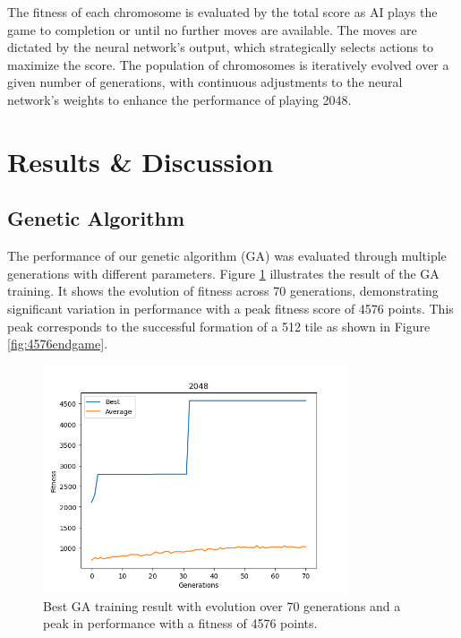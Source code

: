 \documentclass[11pt]{article}
\begin{document}
The fitness of each chromosome is evaluated by the total score as AI plays the game to completion or until no further moves are available. The moves are dictated by the neural network’s output, which strategically selects actions to maximize the score. The population of chromosomes is iteratively evolved over a given number of generations, with continuous adjustments to the neural network's weights to enhance the performance of playing 2048.

\section{Results \& Discussion}


\subsection{Genetic Algorithm}
The performance of our genetic algorithm (GA) was evaluated through multiple generations with different parameters. Figure \ref{fig:fitness} illustrates the result of the GA training. It shows the evolution of fitness across 70 generations, demonstrating significant variation in performance with a peak fitness score of 4576 points. This peak corresponds to the successful formation of a 512 tile as shown in Figure \ref{fig:4576endgame}.

\begin{figure}[ht]
\centering
\includegraphics[width=0.8\textwidth]{4576.png}
\caption{Best GA training result with evolution over 70 generations and a peak in performance with a fitness of 4576 points.}
\label{fig:fitness}
\end{figure}
\end{document}
